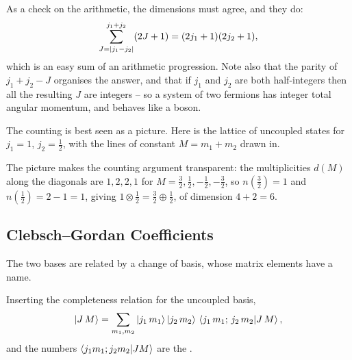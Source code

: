 \documentclass[a4paper]{scrartcl}
\begin{document}
As a check on the arithmetic, the dimensions must agree, and they do:
$$
\sum_{J = \lvert j_1-j_2\rvert}^{j_1+j_2}(2J+1) = (2j_1+1)(2j_2+1),
$$
which is an easy sum of an arithmetic progression. Note also that the parity of $j_1 + j_2 - J$ organises the answer, and that if $j_1$ and $j_2$ are both half-integers then all the resulting $J$ are integers -- so a system of two fermions has integer total angular momentum, and behaves like a boson.

The counting is best seen as a picture. Here is the lattice of uncoupled states for $j_1 = 1$, $j_2 = \frac12$, with the lines of constant $M = m_1+m_2$ drawn in.

\begin{center}
\end{center}

The picture makes the counting argument transparent: the multiplicities $d(M)$ along the diagonals are $1,2,2,1$ for $M = \frac32,\frac12,-\frac12,-\frac32$, so $n(\frac32) = 1$ and $n(\frac12) = 2-1 = 1$, giving $1 \otimes \frac12 = \frac32 \oplus \frac12$, of dimension $4+2 = 6$.

\subsection{Clebsch--Gordan Coefficients}

The two bases are related by a change of basis, whose matrix elements have a name.

\begin{definition}
    Inserting the completeness relation for the uncoupled basis,
    $$
    \ket{J\,M} = \sum_{m_1,m_2}\ket{j_1\,m_1}\ket{j_2\,m_2}\,\braket{j_1\,m_1;\,j_2\,m_2}{J\,M},
    $$
    and the numbers $\braket{j_1 m_1; j_2m_2}{JM}$ are the .
\end{definition}
\end{document}
